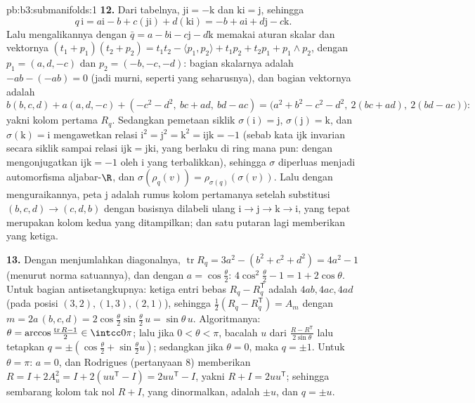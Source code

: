 \begin{solution}{pb:b3:submanifolds:1}
\textbf{12.} Dari tabelnya, $\mathrm{ji} = -\mathrm k$ dan
$\mathrm{ki} = \mathrm j$, sehingga
\[
q\,\mathrm i = a\mathrm i - b + c(\mathrm{ji}) +
d(\mathrm{ki}) = -b + a\mathrm i + d\mathrm j - c\mathrm k .
\]
Lalu mengalikannya dengan $\bar q = a - b\mathrm i - c\mathrm j -
d\mathrm k$ memakai aturan skalar dan vektornya $(t_1 + p_1)(t_2 +
p_2) = t_1t_2 - \langle p_1, p_2\rangle + t_1p_2 + t_2p_1 +
p_1\wedge p_2$, dengan $p_1 = (a, d, -c)$ dan $p_2 = (-b, -c,
-d)$: bagian skalarnya adalah $-ab - (-ab) = 0$ (jadi murni, seperti yang
seharusnya), dan bagian vektornya adalah
\[
b(b, c, d) + a(a, d, -c) + (-c^2 - d^2,\ bc + ad,\ bd - ac)
= \bigl(a^2 + b^2 - c^2 - d^2,\ 2(bc + ad),\ 2(bd -
ac)\bigr):
\]
yakni kolom pertama $R_q$. Sedangkan pemetaan siklik $\sigma(\mathrm i)
= \mathrm j$, $\sigma(\mathrm j) = \mathrm k$, dan
$\sigma(\mathrm k) = \mathrm i$ mengawetkan relasi
$\mathrm i^2 = \mathrm j^2 = \mathrm k^2 = \mathrm{ijk} =
-1$ (sebab kata $\mathrm{ijk}$ invarian secara siklik sampai
relasi $\mathrm{ijk} = \mathrm{jki}$, yang berlaku di
ring mana pun: dengan mengonjugatkan $\mathrm{ijk} = -1$ oleh
$\mathrm i$ yang terbalikkan), sehingga $\sigma$ diperluas menjadi
automorfisma aljabar-$\R$, dan $\sigma(\rho_q(v)) =
\rho_{\sigma(q)}(\sigma(v))$. Lalu dengan menguraikannya, peta
$\mathrm j$ adalah rumus kolom pertamanya setelah
substitusi $(b, c, d) \to (c, d, b)$ dengan basisnya
dilabeli ulang $\mathrm i \to \mathrm j \to \mathrm k \to \mathrm
i$, yang tepat merupakan kolom kedua yang ditampilkan; dan satu
putaran lagi memberikan yang ketiga.

\textbf{13.} Dengan menjumlahkan diagonalnya, $\operatorname{tr}R_q =
3a^2 - (b^2 + c^2 + d^2) = 4a^2 - 1$ (menurut norma satuannya), dan dengan
$a = \cos\frac\theta2$: $4\cos^2\frac\theta2 - 1 = 1 +
2\cos\theta$. Untuk bagian antisetangkupnya: ketiga entri bebas
$R_q - R_q^{\mathsf T}$ adalah $4ab, 4ac, 4ad$ (pada
posisi $(3,2), (1,3), (2,1)$), sehingga $\frac12(R_q -
R_q^{\mathsf T}) = A_m$ dengan $m = 2a\,(b, c, d) =
2\cos\frac\theta2\sin\frac\theta2\,u = \sin\theta\,u$.
Algoritmanya: $\theta = \arccos\frac{\operatorname{tr}R -
1}{2} \in \intcc0\pi$; lalu jika $0 < \theta < \pi$, bacalah $u$ dari
$\frac{R - R^{\mathsf T}}{2\sin\theta}$ lalu tetapkan $q =
\pm(\cos\frac\theta2 + \sin\frac\theta2 u)$; sedangkan jika $\theta =
0$, maka $q = \pm1$. Untuk $\theta = \pi$: $a = 0$, dan Rodrigues
(pertanyaan 8) memberikan $R = I + 2A_u^2 = I + 2(uu^{\mathsf T} -
I) = 2uu^{\mathsf T} - I$, yakni $R + I = 2uu^{\mathsf T}$;
sehingga sembarang kolom tak nol $R + I$, yang dinormalkan, adalah $\pm u$, dan
$q = \pm u$.


\end{solution}
